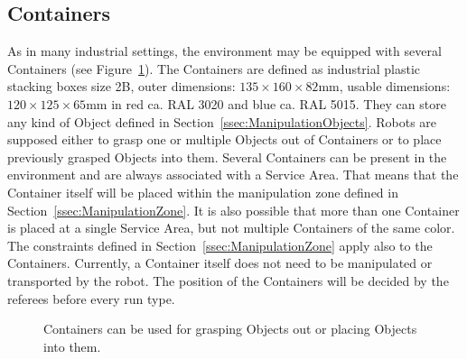 \subsection{Containers}
As in many industrial settings, the \RCAW environment may be equipped with several Containers (see Figure~\ref{fig:containers}). The Containers are defined as industrial plastic stacking boxes size 2B, outer dimensions: $135 \times 160 \times 82  \si{\milli\meter}$, usable dimensions: $120 \times 125 \times 65  \si{\milli\meter}$  in red ca. RAL 3020 and blue ca. RAL 5015.
They can store any kind of Object defined in Section~\ref{ssec:ManipulationObjects}. Robots are supposed either to grasp one or multiple Objects out of Containers or to place previously grasped Objects into them. Several Containers can be present in the environment and are always associated with a Service Area. That means that the Container itself will be placed within the manipulation zone defined in Section~\ref{ssec:ManipulationZone}.
It is also possible that more than one Container is placed at a single Service Area, but not multiple Containers of the same color.
The constraints defined in Section~\ref{ssec:ManipulationZone} apply also to the Containers.
Currently, a Container itself does not need to be manipulated or transported by the robot. The position of the Containers will be decided by the referees before every run type.

\begin{figure} [h!]
	\begin{center}
		\hspace{0.05\textwidth}
	\end{center}
	\caption{Containers can be used for grasping Objects out or placing Objects into them.}
	\label{fig:containers}
\end{figure}


